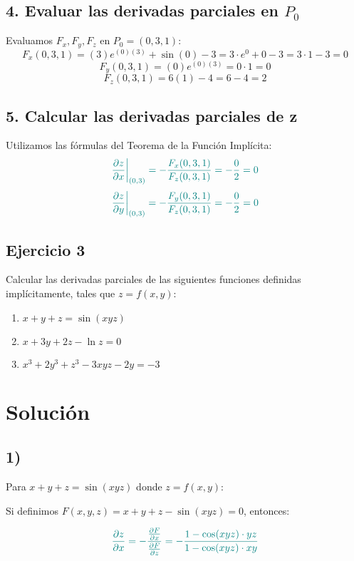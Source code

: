\documentclass{article}
\begin{document}
\subsection*{4. Evaluar las derivadas parciales en $P_0$}
Evaluamos $F_x, F_y, F_z$ en $P_0 = (0, 3, 1)$:
$$F_x(0, 3, 1) = (3) e^{(0)(3)} + \sin(0) - 3 = 3 \cdot e^0 + 0 - 3 = 3 \cdot 1 - 3 = 0$$
$$F_y(0, 3, 1) = (0) e^{(0)(3)} = 0 \cdot 1 = 0$$
$$F_z(0, 3, 1) = 6(1) - 4 = 6 - 4 = 2$$

\subsection*{5. Calcular las derivadas parciales de z}
Utilizamos las fórmulas del Teorema de la Función Implícita:
$$\color{teal}\frac{\partial z}{\partial x} \bigg|_{(0,3)} = - \frac{F_x(0, 3, 1)}{F_z(0, 3, 1)} = - \frac{0}{2} = 0$$
$$\color{teal}\frac{\partial z}{\partial y} \bigg|_{(0,3)} = - \frac{F_y(0, 3, 1)}{F_z(0, 3, 1)} = - \frac{0}{2} = 0$$


\newpage

\subsection{Ejercicio 3}
Calcular las derivadas parciales de las siguientes funciones definidas implícitamente, tales que \(z = f(x,y)\):

\begin{enumerate}
  \item \(x + y + z = \sin(xyz)\)
  \item \(x + 3y + 2z - \ln z = 0\)
  \item \(x^3 + 2y^3 + z^3 - 3xyz - 2y = -3\)
\end{enumerate}


\newpage
\section*{Solución}

\subsection*{1)}
 Para $x + y + z = \sin(xyz)$ donde $z = f(x,y)$:
  
  Si definimos $F(x,y,z) = x + y + z - \sin(xyz) = 0$, entonces:
  
  \begin{equation}\color{teal}
  \frac{\partial z}{\partial x} = -\frac{\frac{\partial F}{\partial x}}{\frac{\partial F}{\partial z}} = -\frac{1 - \cos(xyz) \cdot yz}{1 - \cos(xyz) \cdot xy}
  \end{equation}
  
\end{document}
